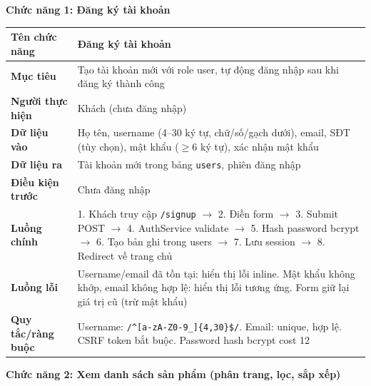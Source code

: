 \documentclass[a4paper]{article}
\begin{document}
\vspace{0.5cm}
\noindent\textbf{Chức năng 1: Đăng ký tài khoản}

\begin{longtable}{|p{3.5cm}|p{10.5cm}|}
\hline
\textbf{Tên chức năng} & Đăng ký tài khoản \\
\hline
\textbf{Mục tiêu} & Tạo tài khoản mới với role user, tự động đăng nhập sau khi đăng ký thành công \\
\hline
\textbf{Người thực hiện} & Khách (chưa đăng nhập) \\
\hline
\textbf{Dữ liệu vào} & Họ tên, username (4--30 ký tự, chữ/số/gạch dưới), email, SĐT (tùy chọn), mật khẩu ($\geq$6 ký tự), xác nhận mật khẩu \\
\hline
\textbf{Dữ liệu ra} & Tài khoản mới trong bảng \texttt{users}, phiên đăng nhập \\
\hline
\textbf{Điều kiện trước} & Chưa đăng nhập \\
\hline
\textbf{Luồng chính} & 1. Khách truy cập \texttt{/signup} $\to$ 2. Điền form $\to$ 3. Submit POST $\to$ 4. AuthService validate $\to$ 5. Hash password bcrypt $\to$ 6. Tạo bản ghi trong users $\to$ 7. Lưu session $\to$ 8. Redirect về trang chủ \\
\hline
\textbf{Luồng lỗi} & Username/email đã tồn tại: hiển thị lỗi inline. Mật khẩu không khớp, email không hợp lệ: hiển thị lỗi tương ứng. Form giữ lại giá trị cũ (trừ mật khẩu) \\
\hline
\textbf{Quy tắc/ràng buộc} & Username: \texttt{/\^{}[a-zA-Z0-9\_]\{4,30\}\$/}. Email: unique, hợp lệ. CSRF token bắt buộc. Password hash bcrypt cost 12 \\
\hline
\end{longtable}

\vspace{0.5cm}
\noindent\textbf{Chức năng 2: Xem danh sách sản phẩm (phân trang, lọc, sắp xếp)}
\end{document}
